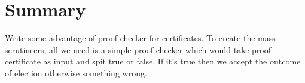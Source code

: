         

  
\section{Summary}
   Write some advantage of proof checker for certificates.
   To create the mass scrutineers, all we need is a simple proof checker
   which would take proof certificate as input and spit true or false.
   If it's true then we accept the outcome of election otherwise something 
   wrong.
 










































   
   
   
   
   
   